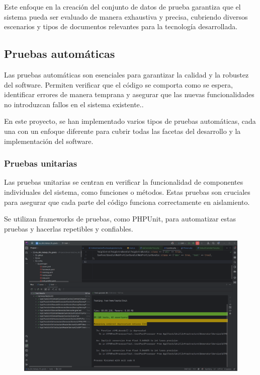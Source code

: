 Este enfoque en la creación del conjunto de datos de prueba garantiza que el sistema pueda ser evaluado de manera exhaustiva y precisa, cubriendo diversos escenarios y tipos de documentos relevantes para la tecnología desarrollada.

\subsection*{Pruebas automáticas}
Las pruebas automáticas son esenciales para garantizar la calidad y la robustez del software. Permiten verificar que el código se comporta como se espera, identificar errores de manera temprana y asegurar que las nuevas funcionalidades no introduzcan fallos en el sistema existente..

En este proyecto, se han implementado varios tipos de pruebas automáticas, cada una con un enfoque diferente para cubrir todas las facetas del desarrollo y la implementación del software.

\subsubsection*{Pruebas unitarias}
Las pruebas unitarias se centran en verificar la funcionalidad de componentes individuales del sistema, como funciones o métodos. Estas pruebas son cruciales para asegurar que cada parte del código funciona correctamente en aislamiento.

Se utilizan frameworks de pruebas, como PHPUnit, para automatizar estas pruebas y hacerlas repetibles y confiables.

\begin{figure}
    \centering
    \includegraphics{./chapter/4/images/ad_4nxf9wl5tpdrrtr3bqpnmamma-tjdxo4hakx3gbtkr7xbxwuphltuchx5wkg5qz1sviw7hdopfifg-etui-spj9crpegapnd0}
    \caption{}
    \label{fig:ad_4nxf9wl5tpdrrtr3bqpnmamma-tjdxo4hakx3gbtkr7xbxwuphltuchx5wkg5qz1sviw7hdopfifg-etui-spj9crpegapnd0}
\end{figure}

